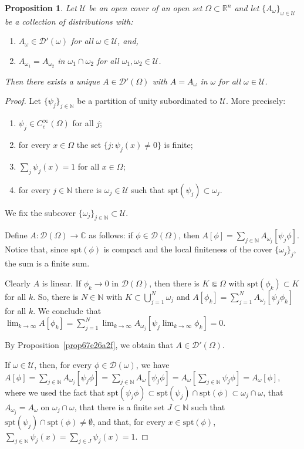 \documentclass[a4paper,9pt]{amsart}
\newcommand{\scr}[1]{\mathscr{#1}}
\newcommand{\N}{\mathbb{N}}	%
\newcommand{\R}{\mathbb{R}}	%
\newcommand{\C}{\mathbb{C}}	%
\newcommand{\spt}{\mathrm{spt}}
\theoremstyle{plain}
\newtheorem{proposition}{Proposition}[section]
\theoremstyle{definition}
\theoremstyle{remark}
\begin{document}
\begin{proposition}\label{prop67eaabf1}
	Let $\scr U$ be an open cover of an open set $\Omega\subset\R^n$ and let $\{A_\omega\}_{\omega\in\scr U}$ be a collection of distributions with:
	\begin{enumerate}
	\item $A_\omega\in\scr D'(\omega)$ for all $\omega\in\scr U$, and,
	\item $A_{\omega_1} = A_{\omega_2}$ in $\omega_1\cap\omega_2$ for all $\omega_1,\omega_2\in \scr U$.
	\end{enumerate}
	Then there exists a unique $A\in\scr D'(\Omega)$ with $A = A_\omega$ in $\omega$ for all $\omega\in\scr U$.
\end{proposition}
\begin{proof}
	Let $\{\psi_j\}_{j\in\N}$ be a partition of unity subordinated to $\scr U$.
	More precisely:
	\begin{enumerate}
	\item $\psi_j\in C^\infty_c(\Omega)$ for all $j$;
	\item for every $x\in\Omega$ the set $\{j:\psi_j(x)\neq0\}$ is finite; 
	\item $\sum_j\psi_j(x) = 1$ for all $x\in \Omega$;
	\item for every $j\in\N$ there is $\omega_j\in\scr U$ such that $\spt(\psi_j)\subset\omega_j$.
	\end{enumerate}
	We fix the subcover $\{\omega_j\}_{j\in\N}\subset\scr U$.
	
	Define $A:\scr D(\Omega)\to\C$ as follows: if $\phi\in\scr D(\Omega)$, then
	$A[\phi] = \sum_{j\in\N} A_{\omega_j}[\psi_j\phi]$.
	Notice that, since $\spt(\phi)$ is compact and the local finiteness of the cover $\{\omega_j\}_j$, the sum is a finite sum.
	
	Clearly $A$ is linear.
	If $\phi_k\to0$ in $\scr D(\Omega)$, then there is $K\Subset\Omega$ with $\spt(\phi_k)\subset K$ for all $k$.
	So, there is $N\in\N$ with $K\subset\bigcup_{j=1}^N\omega_j$ and 
	$A[\phi_k] = \sum_{j=1}^N A_{\omega_j}[\psi_j\phi_k]$ for all $k$.
	We conclude that $\lim_{k\to\infty}A[\phi_k] = \sum_{j=1}^N \lim_{k\to\infty}A_{\omega_j}[\psi_j\lim_{k\to\infty}\phi_k] = 0$.
	
	By Proposition~\ref{prop67e26a2f}, we obtain that $A\in\scr D'(\Omega)$.
	
	If $\omega\in\scr U$, then, for every $\phi\in\scr D(\omega)$, we have
	$A[\phi]= \sum_{j\in\N} A_{\omega_j}[\psi_j\phi]
	= \sum_{j\in\N} A_{\omega}[\psi_j\phi]
	=  A_{\omega}[\sum_{j\in\N}\psi_j\phi]
	= A_\omega [\phi]$,
	where we used the fact that $\spt(\psi_j\phi)\subset\spt(\psi_j)\cap\spt(\phi)\subset\omega_j\cap\omega$,
	that $A_{\omega_j}=A_\omega$ on $\omega_j\cap\omega$,
	that there is a finite set $J\subset\N$ such that $\spt(\psi_j)\cap\spt(\phi)\neq\emptyset$, 
	and that, for every $x\in\spt(\phi)$, $\sum_{j\in\N}\psi_j(x) = \sum_{j\in J}\psi_j(x) = 1$.
	

\end{proof}
\end{document}

